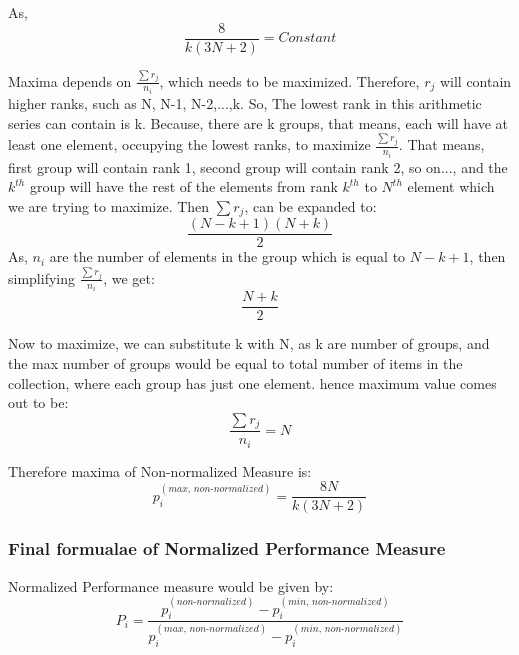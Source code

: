 \documentclass[man,floatsintext]{apa7}
\begin{document}
As, 
\begin{equation}
	\frac{8}{k(3N + 2)} = Constant
\end{equation}

Maxima depends on $\frac{\sum r_j}{n_i}$, which needs to be maximized. Therefore, $r_j$ will contain higher ranks, such as N, N-1, N-2,...,k. So, The lowest rank in this arithmetic series can contain is k. Because, there are k groups, that means, each will have at least one element, occupying the lowest ranks, to maximize $\frac{\sum r_j}{n_i}$. That means, first group will contain rank 1, second group will contain rank 2, so on..., and the $k^{th}$ group will have the rest of the elements from rank $k^{th}$ to $N^{th}$ element which we are trying to maximize. Then $\sum r_j$, can be expanded to:
\begin{equation}
	\frac{(N-k+1)(N+k)}{2}
\end{equation}
As, $n_i$ are the number of elements in the group which is equal to $N-k+1$, then simplifying $\frac{\sum r_j}{n_i}$, we get:
\begin{equation}
	\frac{N+k}{2}
\end{equation}

Now to maximize, we can substitute k with N, as k are number of groups, and the max number of groups would be equal to total number of items in the collection, where each group has just one element.
hence maximum value comes out to be:
\begin{equation}
	\frac{\sum r_j}{n_i} = N
\end{equation}
 
Therefore maxima of Non-normalized Measure is:
\begin{equation}
	\label{eq:maxima}
	p_i^{(max, \, non\text{-}normalized)} = \frac{8N}{k(3N + 2)}
\end{equation}

\subsubsection{Final formualae of Normalized Performance Measure}
Normalized Performance measure would be given by:
\begin{equation}
	\label{eq:normalized-simpler}
	P_i = \frac{p_i^{(non\text{-}normalized)} - p_i^{(min, \, non\text{-}normalized)}}{p_i^{(max, \, non\text{-}normalized)} - p_i^{(min, \, non\text{-}normalized)}}
\end{equation}
\end{document}
